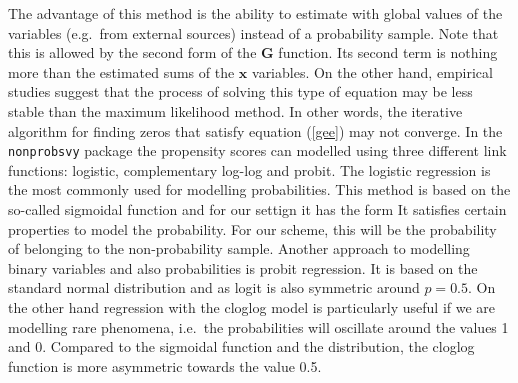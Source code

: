 \documentclass[
]{jss}
\begin{document}
The advantage of this method is the ability to estimate with global
values of the variables (e.g.~from external sources) instead of a
probability sample. Note that this is allowed by the second form of the
\(\mathbf{G}\) function. Its second term is nothing more than the
estimated sums of the \(\boldsymbol{x}\) variables. On the other hand,
empirical studies suggest that the process of solving this type of
equation may be less stable than the maximum likelihood method. In other
words, the iterative algorithm for finding zeros that satisfy equation
(\ref{gee}) may not converge. In the \texttt{nonprobsvy} package the
propensity scores can modelled using three different link functions:
logistic, complementary log-log and probit. The logistic regression is
the most commonly used for modelling probabilities. This method is based
on the so-called sigmoidal function and for our settign it has the form
It satisfies certain properties to model the probability. For our
scheme, this will be the probability of belonging to the non-probability
sample. Another approach to modelling binary variables and also
probabilities is probit regression. It is based on the standard normal
distribution and as logit is also symmetric around \(p = 0.5\). On the
other hand regression with the cloglog model is particularly useful if
we are modelling rare phenomena, i.e.~the probabilities will oscillate
around the values 1 and 0. Compared to the sigmoidal function and the
distribution, the cloglog function is more asymmetric towards the value
0.5.
\end{document}
